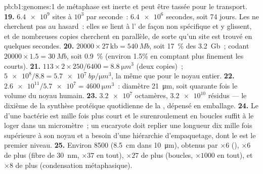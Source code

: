 \begin{solution}{pb:b1:genomes:1}
 de métaphase est inerte et peut être tassée pour le
transport.
\textbf{19.} $\num{6.4e9}$ sites à $10^3$ par seconde~: $\num{6.4e6}$
secondes, soit 74 jours. Les  ne cherchent pas au hasard~:
elles se lient à l' de façon non spécifique et y glissent, et de
nombreuses copies cherchent en parallèle, de sorte qu'un site est trouvé
en quelques secondes.
\textbf{20.} $\num{20000}\times 27\,\mathrm{kb} = \qty{540}{Mb}$, soit
\qty{17}{\%} des \qty{3.2}{Gb}~; codant $\num{20000}\times 1.5 =
\qty{30}{Mb}$, soit \qty{0.9}{\%} (environ 1.5\% en comptant plus
finement les  courts).
\textbf{21.} $113\times 2\times 250/6400 = \qty{8.8}{\micro m^3}$ (deux
copies)~; $\num{5e8}/8.8 = \qty{5.7e7}{bp/\micro m^3}$, la même que pour
le noyau entier.
\textbf{22.} $\num{2.6e11}/\num{5.7e7} = \qty{4600}{\micro m^3}$~:
diamètre \qty{21}{\micro m}, soit quarante fois le volume du noyau
humain.
\textbf{23.} $\num{3.2e7}$ octamères, $\num{3.2e10}$ résidus --- le
dixième de la synthèse protéique quotidienne de la , dépensé en
emballage.
\textbf{24.} Le  d'une bactérie est mille fois plus court et
le surenroulement en boucles suffit à le loger dans un micromètre~; un
eucaryote doit replier une longueur dix mille fois supérieure à son
noyau et a besoin d'une hiérarchie d'empaquetage, dont le  est
le premier niveau.
\textbf{25.} Environ \num{8500} (\qty{8.5}{cm} dans
\qty{10}{\micro m}), obtenus par $\times 6$ (), $\times 6$ de
plus (fibre de \qty{30}{nm}, $\times 37$ en tout), $\times 27$ de plus
(boucles, $\times 1000$ en tout), et $\times 8$ de plus (condensation
métaphasique).
\end{solution}
